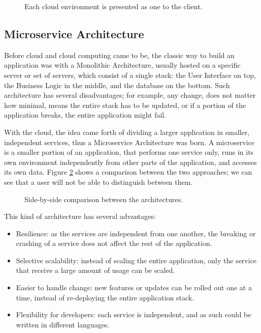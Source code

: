 \begin{figure}[!htb]
    \centering
    
    \caption{Each cloud environment is presented as one to the client. \cite{hybrid}}
    \label{fig:hybrid}
\end{figure}

\subsection{Microservice Architecture}
Before cloud and cloud computing came to be, the classic way to build an application was with a Monolithic Architecture, usually hosted on a specific server or set of servers, which consist of a single stack: the User Interface on top, the Business Logic in the middle, and the database on the bottom.
Such architecture has several disadvantages; for example, any change, does not matter how minimal, means the entire stack has to be updated, or if a portion of the application breaks, the entire application might fail.

With the cloud, the idea came forth of dividing a larger application in smaller, independent services, thus a Microservice Architecture was born. A microservice is a smaller portion of an application, that performs one service only, runs in its own environment independently from other parts of the application, and accesses its own data. Figure \ref{fig:monolithic_vs_microservice} shows a comparison between the two approaches; we can see that a user will not be able to distinguish between them.

\begin{figure}[!htb]
    \centering
    
    \caption{Side-by-side comparison between the architectures. \cite{micro}}
    \label{fig:monolithic_vs_microservice}
\end{figure}

This kind of architecture has several advantages:
\begin{itemize}
    \item Resilience: as the services are independent from one another, the breaking or crashing of a service does not affect the rest of the application.
    \item Selective scalability: instead of scaling the entire application, only the service that receive a large amount of usage can be scaled.
    \item Easier to handle change: new features or updates can be rolled out one at a time, instead of re-deploying the entire application stack.
    \item Flexibility for developers: each service is independent, and as such could be written in different languages. 
\end{itemize}

